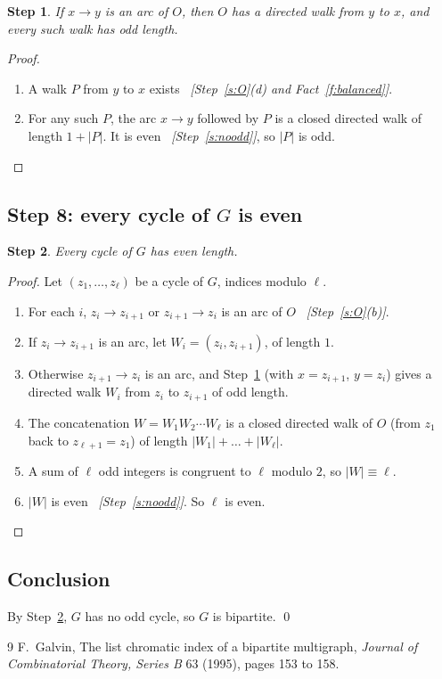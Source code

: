 \documentclass[11pt]{article}
\theoremstyle{plain}
\newtheorem{claim}{Step}
\theoremstyle{definition}
\newcommand{\why}[1]{\unskip\ \textit{[#1]}}
\newenvironment{steps}{\begin{enumerate}[label=(\arabic*),leftmargin=2.2em,itemsep=0.35em]}{\end{enumerate}}
\begin{document}
\begin{claim}\label{s:return}
If $x\to y$ is an arc of $O$, then $O$ has a directed walk from $y$ to $x$, and every such walk
has odd length.
\end{claim}

\begin{proof}
\begin{steps}
  \item A walk $P$ from $y$ to $x$ exists \why{Step~\ref{s:O}(d) and Fact~\ref{f:balanced}}.
  \item For any such $P$, the arc $x\to y$ followed by $P$ is a closed directed walk of length
    $1+|P|$. It is even \why{Step~\ref{s:noodd}}, so $|P|$ is odd. \qedhere
\end{steps}
\end{proof}

\subsection*{Step 8: every cycle of $G$ is even}

\begin{claim}\label{s:even}
Every cycle of $G$ has even length.
\end{claim}

\begin{proof}
Let $(z_1,\dots,z_\ell)$ be a cycle of $G$, indices modulo $\ell$.
\begin{steps}
  \item For each $i$, $z_i\to z_{i+1}$ or $z_{i+1}\to z_i$ is an arc of $O$
    \why{Step~\ref{s:O}(b)}.
  \item If $z_i\to z_{i+1}$ is an arc, let $W_i=(z_i,z_{i+1})$, of length $1$.
  \item Otherwise $z_{i+1}\to z_i$ is an arc, and Step~\ref{s:return} (with $x=z_{i+1}$,
    $y=z_i$) gives a directed walk $W_i$ from $z_i$ to $z_{i+1}$ of odd length.
  \item The concatenation $W=W_1W_2\cdots W_\ell$ is a closed directed walk of $O$ (from $z_1$
    back to $z_{\ell+1}=z_1$) of length $|W_1|+\dots+|W_\ell|$.
  \item A sum of $\ell$ odd integers is congruent to $\ell$ modulo $2$, so $|W|\equiv\ell$.
  \item $|W|$ is even \why{Step~\ref{s:noodd}}. So $\ell$ is even. \qedhere
\end{steps}
\end{proof}

\subsection*{Conclusion}

By Step~\ref{s:even}, $G$ has no odd cycle, so $G$ is bipartite. \qed

\begin{thebibliography}{9}
 F.~Galvin, The list chromatic index of a bipartite multigraph, \emph{Journal of
  Combinatorial Theory, Series B} 63 (1995), pages 153 to 158.
\end{thebibliography}
\end{document}
